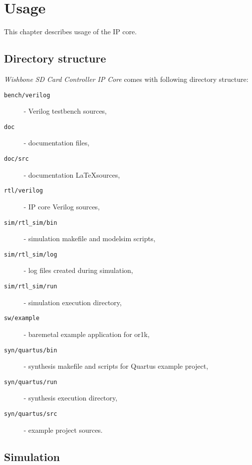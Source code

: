 \section{Usage}
\label{chap:usage}

    This chapter describes usage of the IP core.
    
    \subsection{Directory structure}
    \label{sec:dir_struct}
    
    \textit{Wishbone SD Card Controller IP Core} comes with following directory structure:
    
    
    \begin{description}
    \item[\texttt{bench/verilog}] - Verilog testbench sources,
    \item[\texttt{doc}] - documentation files,
    \item[\texttt{doc/src}] - documentation \LaTeX sources,
    \item[\texttt{rtl/verilog}] - IP core Verilog sources,
    \item[\texttt{sim/rtl\_sim/bin}] - simulation makefile and modelsim scripts,
    \item[\texttt{sim/rtl\_sim/log}] - log files created during simulation,
    \item[\texttt{sim/rtl\_sim/run}] - simulation execution directory,
    \item[\texttt{sw/example}] - baremetal example application for or1k,
    \item[\texttt{syn/quartus/bin}] - synthesis makefile and scripts for Quartus example project,
    \item[\texttt{syn/quartus/run}] - synthesis execution directory,
    \item[\texttt{syn/quartus/src}] - example project sources.
    \end{description}
    
    \subsection{Simulation}
    \label{sec:simulation}
    
